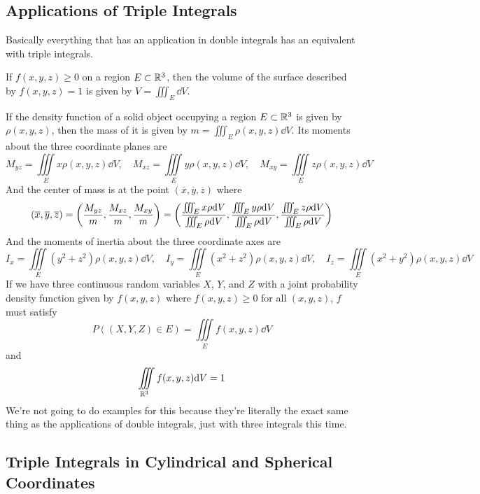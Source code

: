 \subsection{Applications of Triple Integrals}
Basically everything that has an application in double integrals has an equivalent with triple integrals. \par
If $f(x,y,z) \geq 0$ on a region $E\subset \mathbb{R}^3$, then the volume of the surface described by $f(x,y,z) = 1$ is given by $V = \iiint_E \dd V$. \par
If the density function of a solid object occupying a region $E\subset \mathbb{R}^3$ is given by $\rho(x,y,z)$, then the mass of it is given by $m=\iiint_E \rho(x,y,z)\dd V$. Its moments about the three coordinate planes are
\[ M_{yz} = \iiint\limits_E x\rho(x,y,z)\dd V, \quad M_{xz} = \iiint\limits_E y\rho(x,y,z)\dd V, \quad M_{xy} = \iiint\limits_E z\rho(x,y,z)\dd V \]
And the center of mass is at the point $(\overline x, \overline y, \overline z)$ where 
\[ (\overline x, \overline y, \overline z) = \pqty{\frac{M_{yz}}{m}, \frac{M_{xz}}{m}, \frac{M_{xy}}{m}} = \pqty{\frac{\iiint_E x\rho \dd V}{\iiint_E \rho \dd V}, \frac{\iiint_E y\rho \dd V}{\iiint_E \rho \dd V}, \frac{\iiint_E z\rho \dd V}{\iiint_E \rho \dd V}} \]
And the moments of inertia about the three coordinate axes are
\[ I_x = \iiint\limits_E (y^2+z^2)\rho(x,y,z)\dd V, \quad I_y = \iiint\limits_E (x^2+z^2)\rho(x,y,z)\dd V, \quad I_z = \iiint\limits_E (x^2+y^2)\rho(x,y,z)\dd V \] 
If we have three continuous random variables $X$, $Y$, and $Z$ with a joint probability density function given by $f(x,y,z)$ where $f(x,y,z)\geq 0$ for all $(x,y,z)$, $f$ must satisfy
\[ P((X,Y,Z)\in E) = \iiint\limits_Ef(x,y,z)\dd V \]
and 
\[ \iiint\limits_{\mathbb{R}^3}f(x,y,z)\dd V = 1\]
We're not going to do examples for this because they're literally the exact same thing as the applications of double integrals, just with three integrals this time.
\subsection{Triple Integrals in Cylindrical and Spherical Coordinates}

